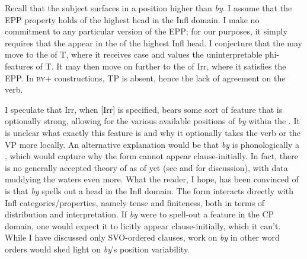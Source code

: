 \documentclass[output=paper,modfonts,newtxmath,hidelinks,]{langscibook}
\begin{document}
\ea \label{10:ex23}
\z\z

\noindent Recall that the subject surfaces in a position higher than \textit{by}. I assume that the EPP property holds of the highest head in the Infl domain. I make no commitment to any particular version of the EPP; for our purposes, it simply requires that the  appear in the  of the highest Infl head. I conjecture that the  may move to the  of T, where it receives case and values the uninterpretable phi-features of T. It may then move on further to the  of Irr, where it satisfies the EPP. In \textsc{by}+ constructions, TP is absent, hence the lack of agreement on the verb.

I speculate that Irr, when [Irr] is specified, bears some sort of feature that is optionally strong, allowing for the various available positions of \textit{by} within the . It is unclear what exactly this feature is and why it optionally takes the verb or the VP more locally. An alternative explanation would be that \textit{by} is phonologically a , which would capture why the form cannot appear clause-initially. In fact, there is no generally accepted theory of   as of yet (see \citealt{KallestinovaSlabakova2008} and \citealt{Bailyn2011} for discussion), with  data muddying the waters even more. What the reader, I hope, has been convinced of is that \textit{by} spells out a head in the Infl domain. The form interacts directly with Infl categories/properties, namely tense and finiteness, both in terms of distribution and interpretation. If \textit{by} were to spell-out a feature in the CP domain, one would expect it to licitly appear clause-initially, which it can’t. While I have discussed only SVO-ordered clauses, work on \textit{by} in other word orders would shed light on \textit{by}’s position variability.
\end{document}
